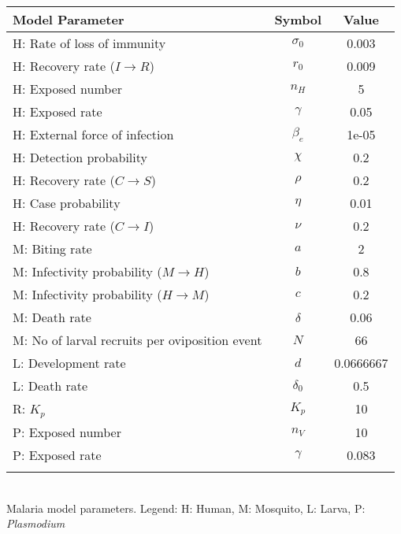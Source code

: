 \begin{table}
\noindent
\begin{tabular}{lcc}
{\bf Model Parameter} & {\bf Symbol} & {\bf Value}\\
\hline\hline
  H: Rate of loss of immunity & $\sigma_0$ & 0.003\\
  H: Recovery rate ($I \rightarrow R$) & $r_0$ & 0.009\\
  H: Exposed number & $n_H$ & 5\\
  H: Exposed rate & $\gamma$ & 0.05\\
  H: External force of infection & $\beta_e$ & 1e-05\\
  H: Detection probability & $\chi$ & 0.2\\
  H: Recovery rate ($C \rightarrow S$) & $\rho$ & 0.2\\
  H: Case probability & $\eta$ & 0.01\\
  H: Recovery rate ($C \rightarrow I$) & $\nu$ & 0.2\\
  M: Biting rate & $a$ & 2\\
  M: Infectivity probability ($M \rightarrow H$) & $b$ & 0.8\\
  M: Infectivity probability ($H \rightarrow M$) & $c$ & 0.2\\
  M: Death rate & $\delta$ & 0.06\\
  M: No of larval recruits per oviposition event & $N$ & 66\\
  L: Development rate & $d$ & 0.0666667\\
  L: Death rate & $\delta_0$ & 0.5\\
  R: $K_p$ & $K_p$ & 10\\
  P: Exposed number & $n_V$ & 10\\
  P: Exposed rate & $\gamma$ & 0.083\\
\hline\hline
\smallskip
\end{tabular}\\
 Malaria model parameters. Legend: {\small H: Human, M: Mosquito, L: Larva, P: {\em Plasmodium}}
\end{table}
